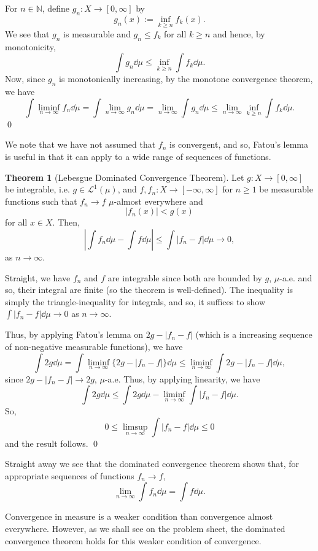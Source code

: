 \documentclass[
]{article}
\theoremstyle{definition}
\newtheorem{theorem}{Theorem}
\theoremstyle{definition}
\begin{document}
For \(n \in \mathbb{N}\), define \(g_n : X \to [0, \infty]\) by
\[g_n(x) := \inf_{k \ge n} f_k(x).\] We see that \(g_n\) is measurable
and \(g_n \le f_k\) for all \(k \ge n\) and hence, by monotonicity,
\[\int g_n \dd \mu \le \inf_{k \ge n} \int f_k \dd \mu.\] Now, since
\(g_n\) is monotonically increasing, by the monotone convergence
theorem, we have \[\int \liminf_{n \to \infty} f_n \dd \mu 
    = \int \lim_{n \to \infty} g_n \dd \mu 
    = \lim_{n \to \infty} \int g_n \dd \mu 
    \le \lim_{n \to \infty} \inf_{k \ge n} \int f_k \dd \mu.\] \qed

We note that we have not assumed that \(f_n\) is convergent, and so,
Fatou's lemma is useful in that it can apply to a wide range of
sequences of functions.

\begin{theorem}[Lebesgue Dominated Convergence Theorem]
  Let \(g : X \to [0, \infty]\) be integrable, i.e. \(g \in \mathcal{L}^1(\mu)\), 
  and \(f, f_n : X \to [- \infty, \infty]\) for \(n \ge 1\) be measurable functions 
  such that \(f_n \to f\) \(\mu\)-almost everywhere and 
  \[| f_n(x) | < g(x)\]
  for all \(x \in X\). Then, 
  \[\left| \int f_n \dd \mu - \int f \dd \mu \right| \le \int |f_n - f| \dd \mu \to 0,\]
  as \(n \to \infty\).
\end{theorem}
\proof

Straight, we have \(f_n\) and \(f\) are integrable since both are
bounded by \(g\), \(\mu\)-a.e. and so, their integral are finite (so the
theorem is well-defined). The inequality is simply the
triangle-inequality for integrals, and so, it suffices to show
\(\int |f_n - f| \dd \mu \to 0\) as \(n \to \infty\).

Thus, by applying Fatou's lemma on \(2g - |f_n - f|\) (which is a
increasing sequence of non-negative measurable functions), we have
\[\int 2g \dd \mu = \int \liminf_{n \to \infty} \{2g - |f_n - f|\} \dd \mu \le \liminf_{n \to \infty} 
    \int 2g - |f_n - f| \dd \mu, \] since \(2g - |f_n - f| \to 2g\),
\(\mu\)-a.e. Thus, by applying linearity, we have
\[\int 2g \dd \mu \le \int 2g \dd \mu - \liminf_{n \to \infty} \int |f_n - f| \dd \mu.\]
So, \[0 \le \limsup_{n \to \infty} \int |f_n - f| \dd \mu \le 0\] and
the result follows. \qed

Straight away we see that the dominated convergence theorem shows that,
for appropriate sequences of functions \(f_n \to f\),
\[\lim_{n \to \infty} \int f_n \dd \mu = \int f \dd \mu.\]

Convergence in measure is a weaker condition than convergence almost
everywhere. However, as we shall see on the problem sheet, the dominated
convergence theorem holds for this weaker condition of convergence.
\end{document}
